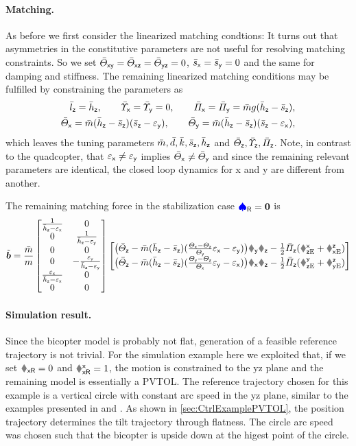 \paragraph{Matching.}
As before we first consider the linearized matching condtions:
It turns out that asymmetries in the constitutive parameters are not useful for resolving matching constraints.
So we set $\bar{\varTheta}_{\mathsf{x}\mathsf{y}}=\bar{\varTheta}_{\mathsf{x}\mathsf{z}}=\bar{\varTheta}_{\mathsf{y}\mathsf{z}}=0$, $\bar{s}_{\mathsf{x}}=\bar{s}_{\mathsf{y}}=0$ and the same for damping and stiffness.
The remaining linearized matching conditions may be fulfilled by constraining the parameters as
\begin{subequations}
\begin{align} 
 \bar{l}_{\mathsf{z}} = \bar{h}_{\mathsf{z}},
\qquad
 \bar{\varUpsilon}_{\mathsf{x}} = \bar{\varUpsilon}_{\mathsf{y}} = 0,
\qquad
 \bar{\varPi}_{\mathsf{x}} = \bar{\varPi}_{\mathsf{y}} = \bar{m} g (\bar{h}_{\mathsf{z}}-\bar{s}_{\mathsf{z}}),
\\
 \bar{\varTheta}_{\mathsf{x}} = \bar{m} (\bar{h}_{\mathsf{z}}-\bar{s}_{\mathsf{z}})(\bar{s}_{\mathsf{z}}-\varepsilon_{\mathsf{y}}),
\qquad
 \bar{\varTheta}_{\mathsf{y}} = \bar{m}(\bar{h}_{\mathsf{z}}-\bar{s}_{\mathsf{z}}) (\bar{s}_{\mathsf{z}}-\varepsilon_{\mathsf{x}}),
\end{align}
\end{subequations}
which leaves the tuning parameters $\bar{m}, \bar{d}, \bar{k}, \bar{s}_{\mathsf{z}}, \bar{h}_{\mathsf{z}}$ and $\bar{\varTheta}_{\mathsf{z}}, \bar{\varUpsilon}_{\mathsf{z}}, \bar{\varPi}_{\mathsf{z}}$.
Note, in contrast to the quadcopter, that $\varepsilon_{\mathsf{x}} \neq \varepsilon_{\mathsf{y}}$ implies $\bar{\varTheta}_{\mathsf{x}} \neq \bar{\varTheta}_{\mathsf{y}}$ and since the remaining relevant parameters are identical, the closed loop dynamics for x and y are different from another.

The remaining matching force in the stabilization case $\boldsymbol{\textcolor{blue}{\spadesuit}}_{\mathsf{R}} = \boldsymbol{0}$ is
\begin{align}
 \tilde{\sysForce} = \frac{\mc}{m}
 \begin{bmatrix} \frac{1}{\hcz-\epsx} & 0 \\ 0 & \frac{1}{\hcz-\epsy} \\ 0 & 0 \\ 0 & -\frac{\epsy}{\hcz-\epsy} \\ \frac{\epsx}{\hcz-\epsx} & 0 \\ 0 & 0 \end{bmatrix}
 \begin{bmatrix}
  \big( \Jcz - \mc(\hcz-\scz) (\tfrac{\Jx-\Jz}{\Jy}\epsx - \epsy) \big) \wy\wz - \tfrac{1}{2} \kapcz (\RExz+\REzx) \\
  \big( \Jcz - \mc(\hcz-\scz) (\tfrac{\Jy-\Jz}{\Jx}\epsy - \epsx) \big) \wx\wz - \tfrac{1}{2} \kapcz (\REyz+\REzy)
 \end{bmatrix}
\end{align}

\paragraph{Simulation result.}
Since the bicopter model is probably not flat, generation of a feasible reference trajectory is not trivial. 
For the simulation example here we exploited that, if we set $\rRx = 0$ and $\RRxx=1$, the motion is constrained to the yz plane and the remaining model is essentially a PVTOL.
The reference trajectory chosen for this example is a vertical circle with constant arc speed in the yz plane, similar to the examples presented in \cite{Konz:AT} and \cite{Konz:GaussTrackingControl}.
As shown in \autoref{sec:CtrlExamplePVTOL}, the position trajectory determines the tilt trajectory through flatness.
The circle arc speed was chosen such that the bicopter is upside down at the higest point of the circle.

